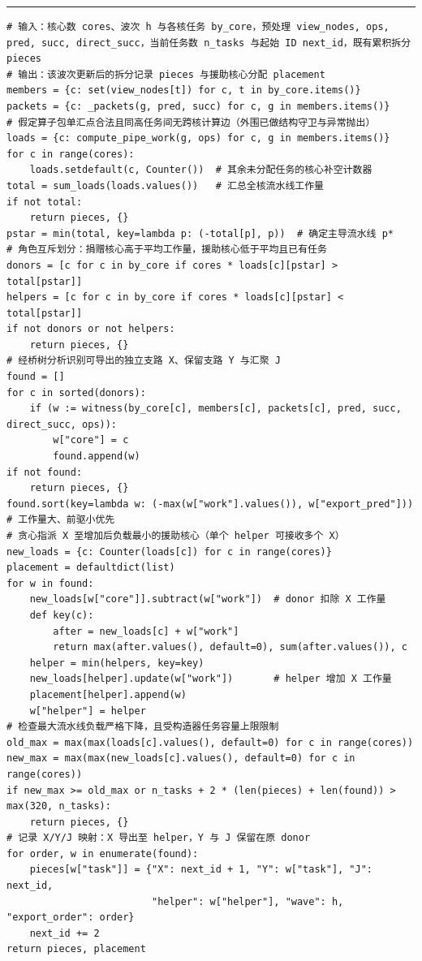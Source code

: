 \documentclass[anonymous,withtoc]{gmcm2026}
\begin{document}
\par{}\begingroup\normalsize
\captionsetup{type=algorithm,position=top,justification=raggedright,singlelinecheck=false,labelfont=bf}
\label{alg:p1-branch-aid}
\nopagebreak\hrule\nopagebreak


\begin{lstlisting}[style=paperpseudo]
# 输入：核心数 cores、波次 h 与各核任务 by_core，预处理 view_nodes, ops, pred, succ, direct_succ，当前任务数 n_tasks 与起始 ID next_id，既有累积拆分 pieces
# 输出：该波次更新后的拆分记录 pieces 与援助核心分配 placement
members = {c: set(view_nodes[t]) for c, t in by_core.items()}
packets = {c: _packets(g, pred, succ) for c, g in members.items()}
# 假定算子包单汇点合法且同高任务间无跨核计算边（外围已做结构守卫与异常抛出）
loads = {c: compute_pipe_work(g, ops) for c, g in members.items()}
for c in range(cores):
    loads.setdefault(c, Counter())  # 其余未分配任务的核心补空计数器
total = sum_loads(loads.values())   # 汇总全核流水线工作量
if not total:
    return pieces, {}
pstar = min(total, key=lambda p: (-total[p], p))  # 确定主导流水线 p*
# 角色互斥划分：捐赠核心高于平均工作量，援助核心低于平均且已有任务
donors = [c for c in by_core if cores * loads[c][pstar] > total[pstar]]
helpers = [c for c in by_core if cores * loads[c][pstar] < total[pstar]]
if not donors or not helpers:
    return pieces, {}
# 经桥树分析识别可导出的独立支路 X、保留支路 Y 与汇聚 J
found = []
for c in sorted(donors):
    if (w := witness(by_core[c], members[c], packets[c], pred, succ, direct_succ, ops)):
        w["core"] = c
        found.append(w)
if not found:
    return pieces, {}
found.sort(key=lambda w: (-max(w["work"].values()), w["export_pred"]))  # 工作量大、前驱小优先
# 贪心指派 X 至增加后负载最小的援助核心（单个 helper 可接收多个 X）
new_loads = {c: Counter(loads[c]) for c in range(cores)}
placement = defaultdict(list)
for w in found:
    new_loads[w["core"]].subtract(w["work"])  # donor 扣除 X 工作量
    def key(c):
        after = new_loads[c] + w["work"]
        return max(after.values(), default=0), sum(after.values()), c
    helper = min(helpers, key=key)
    new_loads[helper].update(w["work"])       # helper 增加 X 工作量
    placement[helper].append(w)
    w["helper"] = helper
# 检查最大流水线负载严格下降，且受构造器任务容量上限限制
old_max = max(max(loads[c].values(), default=0) for c in range(cores))
new_max = max(max(new_loads[c].values(), default=0) for c in range(cores))
if new_max >= old_max or n_tasks + 2 * (len(pieces) + len(found)) > max(320, n_tasks):
    return pieces, {}
# 记录 X/Y/J 映射：X 导出至 helper，Y 与 J 保留在原 donor
for order, w in enumerate(found):
    pieces[w["task"]] = {"X": next_id + 1, "Y": w["task"], "J": next_id,
                         "helper": w["helper"], "wave": h, "export_order": order}
    next_id += 2
return pieces, placement
\end{lstlisting}
\end{document}
